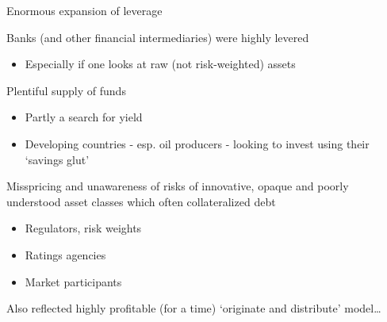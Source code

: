 

\begin{frame}{Enormous expansion of leverage}

Banks (and other financial intermediaries) were highly levered
	\begin{itemize}
	\item	Especially if one looks at raw (not risk-weighted) assets
	\end{itemize}
\vspace{2mm}
Plentiful supply of funds
	\begin{itemize}
	\item	Partly a search for yield
	\item	Developing countries - esp. oil producers - looking to invest using their `savings glut'
	\end{itemize}
\vspace{2mm}
Misspricing and unawareness of risks of innovative, opaque and poorly understood asset classes which often collateralized debt
	\begin{itemize}
	\item	Regulators, risk weights
	\item	Ratings agencies
	\item	Market participants
	\end{itemize}
\vspace{2mm}
Also reflected highly profitable (for a time) `originate and distribute' model\ldots
	
\end{frame}



